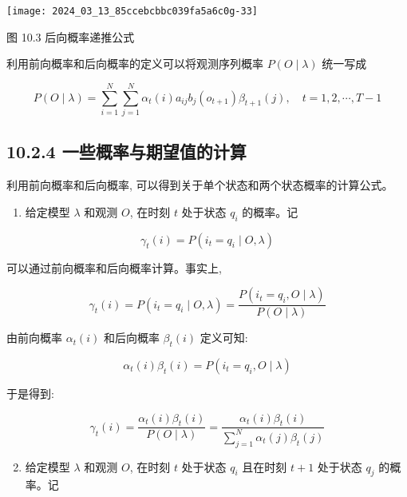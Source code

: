 \documentclass[10pt]{article}
\begin{document}
\begin{center}
\texttt{[image: 2024\_03\_13\_85ccebcbbc039fa5a6c0g-33]}
\end{center}

图 10.3 后向概率递推公式

利用前向概率和后向概率的定义可以将观测序列概率 $P(O \mid \lambda)$ 统一写成


\begin{equation*}
P(O \mid \lambda)=\sum_{i=1}^{N} \sum_{j=1}^{N} \alpha_{t}(i) a_{i j} b_{j}\left(o_{t+1}\right) \beta_{t+1}(j), \quad t=1,2, \cdots, T-1 \tag{10.22}
\end{equation*}


\subsection*{10.2.4 一些概率与期望值的计算}
利用前向概率和后向概率, 可以得到关于单个状态和两个状态概率的计算公式。

\begin{enumerate}
  \item 给定模型 $\lambda$ 和观测 $O$, 在时刻 $t$ 处于状态 $q_{i}$ 的概率。记
\end{enumerate}


\begin{equation*}
\gamma_{t}(i)=P\left(i_{t}=q_{i} \mid O, \lambda\right) \tag{10.23}
\end{equation*}


可以通过前向概率和后向概率计算。事实上,

$$
\gamma_{t}(i)=P\left(i_{t}=q_{i} \mid O, \lambda\right)=\frac{P\left(i_{t}=q_{i}, O \mid \lambda\right)}{P(O \mid \lambda)}
$$

由前向概率 $\alpha_{t}(i)$ 和后向概率 $\beta_{t}(i)$ 定义可知:

$$
\alpha_{t}(i) \beta_{t}(i)=P\left(i_{t}=q_{i}, O \mid \lambda\right)
$$

于是得到:


\begin{equation*}
\gamma_{t}(i)=\frac{\alpha_{t}(i) \beta_{t}(i)}{P(O \mid \lambda)}=\frac{\alpha_{t}(i) \beta_{t}(i)}{\sum_{j=1}^{N} \alpha_{t}(j) \beta_{t}(j)} \tag{10.24}
\end{equation*}


\begin{enumerate}
  \setcounter{enumi}{1}
  \item 给定模型 $\lambda$ 和观测 $O$, 在时刻 $t$ 处于状态 $q_{i}$ 且在时刻 $t+1$ 处于状态 $q_{j}$ 的概率。记
\end{enumerate}
\end{document}
